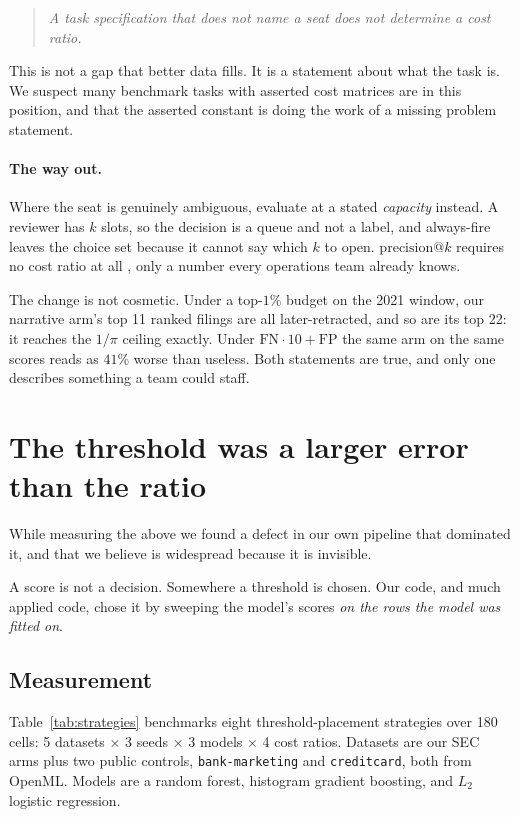 \documentclass[11pt]{article}
\begin{document}
\begin{quote}
\emph{A task specification that does not name a seat does not determine a cost ratio.}
\end{quote}

This is not a gap that better data fills. It is a statement about what the task is. We suspect
many benchmark tasks with asserted cost matrices are in this position, and that the asserted
constant is doing the work of a missing problem statement.

\paragraph{The way out.} Where the seat is genuinely ambiguous, evaluate at a stated
\emph{capacity} instead. A reviewer has $k$ slots, so the decision is a queue and not a label,
and always-fire leaves the choice set because it cannot say which $k$ to open.
$\mathrm{precision}@k$ requires no cost ratio at all \citep{consequentialist2025}, only a number
every operations team already knows.

The change is not cosmetic. Under a top-$1\%$ budget on the 2021 window, our narrative arm's
top 11 ranked filings are all later-retracted, and so are its top 22: it reaches the $1/\pi$
ceiling exactly. Under $\mathrm{FN}\cdot 10 + \mathrm{FP}$ the same arm on the same scores reads
as $41\%$ worse than useless. Both statements are true, and only one describes something a team
could staff.

\section{The threshold was a larger error than the ratio}
\label{sec:threshold}

While measuring the above we found a defect in our own pipeline that dominated it, and that we
believe is widespread because it is invisible.

A score is not a decision. Somewhere a threshold is chosen. Our code, and much applied code,
chose it by sweeping the model's scores \emph{on the rows the model was fitted on}.

\subsection{Measurement}

Table~\ref{tab:strategies} benchmarks eight threshold-placement strategies over 180 cells:
5 datasets $\times$ 3 seeds $\times$ 3 models $\times$ 4 cost ratios. Datasets are our SEC arms
plus two public controls, \texttt{bank-marketing} and \texttt{creditcard}, both from OpenML.
Models are a random forest, histogram gradient boosting, and $L_2$ logistic regression.
\end{document}
